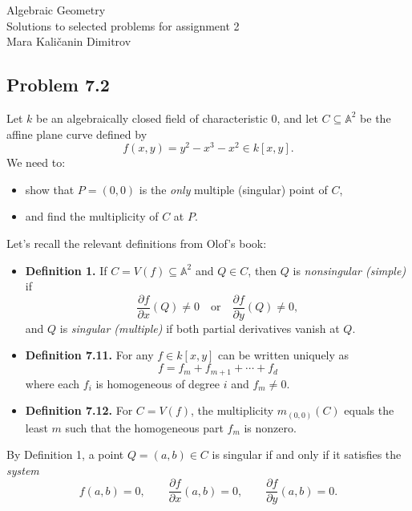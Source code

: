 \documentclass[a4paper,12pt,openany]{article}
\theoremstyle{plain}
\theoremstyle{definition}
\theoremstyle{remark}
\begin{document}
\begin{center}
\huge Algebraic Geometry\\
\vspace{0.2cm}
\Large Solutions to selected problems for assignment 2 \\  \vspace{0.5cm}
Mara Kali\v{c}anin Dimitrov
\vspace{0.5cm}
\end{center}

\subsection*{Problem 7.2}
Let $k$ be an algebraically closed field of characteristic $0$,
and let $C\subseteq \mathbb{A}^2$ be the affine plane curve defined by
\[
f(x,y)=y^{2}-x^{3}-x^{2}\in k[x,y].
\]
We need to:
\begin{itemize}
\item[i)] show that $P=(0,0)$ is the \emph{only} multiple (singular) point of $C$,
\item[ii)] and find the multiplicity of $C$ at $P$.
\end{itemize}

\medskip

Let's recall the relevant definitions from Olof's book:
\begin{itemize}
\item  \textbf{Definition 1.} If $C=V(f)\subseteq \mathbb{A}^2$ and $Q\in C$, then $Q$ is \emph{nonsingular (simple)} if
\[
\frac{\partial f}{\partial x}(Q)\neq 0 \quad \text{or}\quad \frac{\partial f}{\partial y}(Q)\neq 0,
\]
and $Q$ is \emph{singular (multiple)} if both partial derivatives vanish at $Q$.

\item \textbf{Definition 7.11.} For any $f\in k[x,y]$ can be written uniquely as
\[
f=f_m+f_{m+1}+\cdots+f_d
\]
where each $f_i$ is homogeneous of degree $i$ and $f_m\neq 0$.

\item \textbf{Definition 7.12.} For $C=V(f)$, the multiplicity $m_{(0,0)}(C)$ equals the least $m$
such that the homogeneous part $f_m$ is nonzero.
\end{itemize}

\medskip

By Definition 1, a point $Q=(a,b)\in C$ is singular if and only if it satisfies the \emph{system}
\[
f(a,b)=0,\qquad \frac{\partial f}{\partial x}(a,b)=0,\qquad \frac{\partial f}{\partial y}(a,b)=0.
\]
\end{document}
